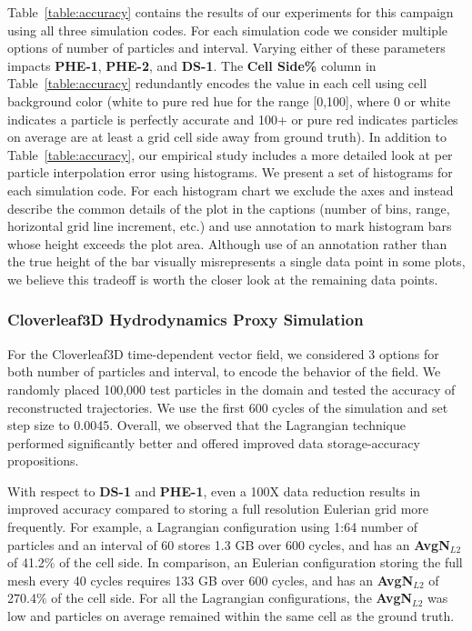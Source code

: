 

Table~\ref{table:accuracy} contains the results of our experiments for this campaign using all three simulation codes.
%
For each simulation code we consider multiple options of number of particles and interval.
%
Varying either of these parameters impacts \textbf{PHE-1}, \textbf{PHE-2}, and \textbf{DS-1}.
%
The \textbf{Cell Side\%} column in Table~\ref{table:accuracy} redundantly encodes the value in each cell using cell background color (white to pure red hue for the range [0,100], where 0 or white indicates a particle is perfectly accurate and 100+ or pure red indicates particles on average are at least a grid cell side away from ground truth).
%
In addition to Table~\ref{table:accuracy}, our empirical study includes a more detailed look at per particle interpolation error using histograms.
%
We present a set of histograms for each simulation code. 
%
For each histogram chart we exclude the axes and instead describe the common details of the plot in the captions (number of bins, range, horizontal grid line increment, etc.) and use annotation to mark histogram bars whose height exceeds the plot area.
%
Although use of an annotation rather than the true height of the bar visually misrepresents a single data point in some plots, we believe this tradeoff is worth the closer look at the remaining data points.


%
\subsubsection{Cloverleaf3D Hydrodynamics Proxy Simulation}
For the Cloverleaf3D time-dependent vector field, we considered 3 options for both number of particles and interval, to encode the behavior of the field.
%
We randomly placed 100,000 test particles in the domain and tested the accuracy of reconstructed trajectories.
%
We use the first 600 cycles of the simulation and set step size to 0.0045.
%
Overall, we observed that the Lagrangian technique performed significantly better and offered improved data storage-accuracy propositions.

With respect to \textbf{DS-1} and \textbf{PHE-1}, even a 100X data reduction results in improved accuracy compared to storing a full resolution Eulerian grid more frequently. 
%
For example, a Lagrangian configuration using 1:64 number of particles and an interval of 60 stores 1.3 GB over 600 cycles, and has an \textbf{AvgN$_{L2}$} of 41.2\% of the cell side. 
%
In comparison, an Eulerian configuration storing the full mesh every 40 cycles requires 133 GB over 600 cycles, and has an \textbf{AvgN$_{L2}$} of 270.4\% of the cell side.
%
For all the Lagrangian configurations, the \textbf{AvgN$_{L2}$} was low and particles on average remained within the same cell as the ground truth.
%

